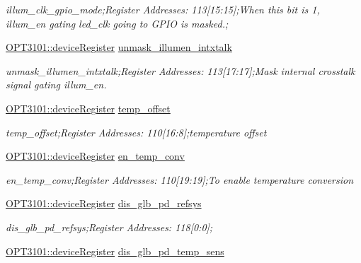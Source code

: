 \begin{DoxyCompactItemize}
\begin{DoxyCompactList}\small\item\em illum\+\_\+clk\+\_\+gpio\+\_\+mode;Register Addresses\+: 113\mbox{[}15\+:15\mbox{]};When this bit is \textquotesingle{}1\textquotesingle{}, illum\+\_\+en gating led\+\_\+clk going to G\+P\+IO is masked.; \end{DoxyCompactList}\item 
\mbox{\hyperlink{class_o_p_t3101_1_1device_register}{O\+P\+T3101\+::device\+Register}} \mbox{\hyperlink{class_o_p_t3101_1_1registers_a08f87e1e66f332f99a6410f1c3ddd845}{unmask\+\_\+illumen\+\_\+intxtalk}}
\begin{DoxyCompactList}\small\item\em unmask\+\_\+illumen\+\_\+intxtalk;Register Addresses\+: 113\mbox{[}17\+:17\mbox{]};Mask internal crosstalk signal gating illum\+\_\+en. \end{DoxyCompactList}\item 
\mbox{\hyperlink{class_o_p_t3101_1_1device_register}{O\+P\+T3101\+::device\+Register}} \mbox{\hyperlink{class_o_p_t3101_1_1registers_adc72f1720585bde4904a093fa4e7e45a}{temp\+\_\+offset}}
\begin{DoxyCompactList}\small\item\em temp\+\_\+offset;Register Addresses\+: 110\mbox{[}16\+:8\mbox{]};temperature offset \end{DoxyCompactList}\item 
\mbox{\hyperlink{class_o_p_t3101_1_1device_register}{O\+P\+T3101\+::device\+Register}} \mbox{\hyperlink{class_o_p_t3101_1_1registers_ad173e07a43ed5567cae02a49dd9ffdeb}{en\+\_\+temp\+\_\+conv}}
\begin{DoxyCompactList}\small\item\em en\+\_\+temp\+\_\+conv;Register Addresses\+: 110\mbox{[}19\+:19\mbox{]};To enable temperature conversion \end{DoxyCompactList}\item 
\mbox{\hyperlink{class_o_p_t3101_1_1device_register}{O\+P\+T3101\+::device\+Register}} \mbox{\hyperlink{class_o_p_t3101_1_1registers_a5cbda22710d9853c8d94b559fdaf44c6}{dis\+\_\+glb\+\_\+pd\+\_\+refsys}}
\begin{DoxyCompactList}\small\item\em dis\+\_\+glb\+\_\+pd\+\_\+refsys;Register Addresses\+: 118\mbox{[}0\+:0\mbox{]}; \end{DoxyCompactList}\item 
\mbox{\hyperlink{class_o_p_t3101_1_1device_register}{O\+P\+T3101\+::device\+Register}} \mbox{\hyperlink{class_o_p_t3101_1_1registers_aa3b8febd4cfdb709dca4027e389b5c58}{dis\+\_\+glb\+\_\+pd\+\_\+temp\+\_\+sens}}

\end{DoxyCompactItemize}
